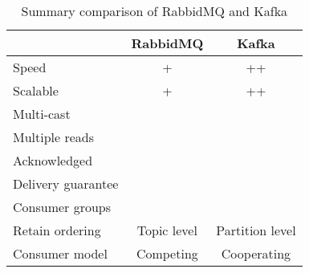 \begin{table}
\centering
\begin{tabular}{|l||c|c|}\hline
  					& RabbidMQ 			& Kafka 		\\ \hline 
Speed				& + 				& ++ 			\\ \hline
Scalable			& +					& ++	 		\\ \hline
Multi-cast			&\xmark				& \cmark		\\ \hline
Multiple reads		&\xmark				& \cmark		\\ \hline
Acknowledged		&\cmark				& \xmark		\\ \hline
Delivery guarantee	&\cmark				& \xmark		\\ \hline
Consumer groups		&\cmark				&\cmark			\\ \hline
Retain ordering		&Topic level		& Partition level\\ \hline
Consumer model	 	&Competing			& Cooperating	\\ \hline
\end{tabular}
\caption{Summary comparison of RabbidMQ and Kafka}
\label{table:rabbidmq-kafka}
\end{table}

 
